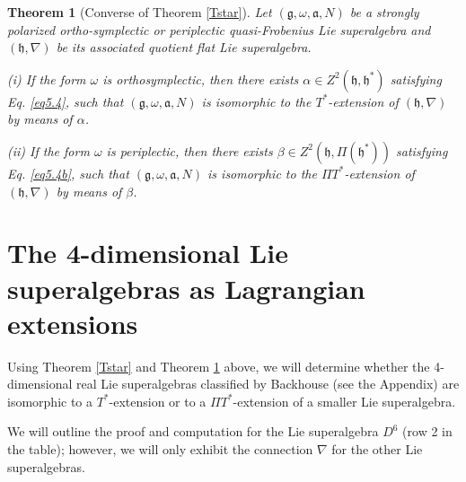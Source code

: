 \documentclass[12pt]{amsart}
\newtheorem{Theorem}{Theorem}[section]
\begin{document}
\begin{Theorem} [Converse of Theorem \ref{Tstar}] \label{TstarConv} Let $(\mathfrak{g}, \omega, \mathfrak{a},N)$ be a strongly polarized ortho-symplectic or periplectic quasi-Frobenius Lie superalgebra and $(\mathfrak{h}, \nabla)$ be its associated quotient flat Lie superalgebra. 

\textup{(}i\textup{)} If the form $\omega$ is orthosymplectic, then there exists $\alpha \in Z^2(\mathfrak{h}, \mathfrak{h}^*)$ 
satisfying Eq. \eqref{eq5.4}, such that $(\mathfrak{g}, \omega, \mathfrak{a},N)$ is isomorphic to the $T^*$-extension of $(\mathfrak{h},\nabla)$ by means of $\alpha$.

\textup{(}ii\textup{)} If the form $\omega$ is periplectic, then there exists $\beta \in Z^2(\mathfrak{h}, \Pi(\mathfrak{h}^*))$ 
satisfying Eq. \eqref{eq5.4b}, such that $(\mathfrak{g}, \omega, \mathfrak{a},N)$ is isomorphic to the $\Pi T^*$-extension of $(\mathfrak{h},\nabla)$ by means of $\beta$.

\end{Theorem}
\section{The 4-dimensional Lie superalgebras as Lagrangian extensions} \label{Tstar2}
Using Theorem \ref{Tstar} and Theorem  \ref{TstarConv} above,  we will determine whether the 4-dimensional real Lie superalgebras classified by Backhouse (see the Appendix) are isomorphic to a $T^*$-extension or to a $\Pi T^*$-extension of a smaller Lie superalgebra. 

We will outline the proof and computation for the Lie superalgebra $D^6$ (row 2 in the table); however, we will only exhibit the connection $\nabla$ for the other Lie superalgebras. 
\end{document}
